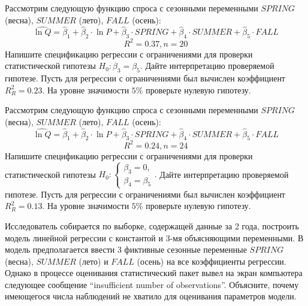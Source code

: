 \documentclass[pdftex,11pt,openany]{book}\usepackage[]{graphicx}\usepackage[]{color}
\begin{document}
\begin{problem}
 Рассмотрим следующую функцию спроса с сезонными переменными $SPRING$ (весна), $SUMMER$ (лето), $FALL$ (осень):
\[
\widehat{\ln Q}=\hat{\beta}_1+\hat{\beta}_2\cdot{\ln P}+\hat{\beta}_3\cdot{SPRING}+\hat{\beta}_4\cdot{SUMMER}+\hat{\beta}_5\cdot{FALL}
\]
\[
R^2=0.37,n=20
\]
Напишите спецификацию регрессии с ограничениями для проверки статистической гипотезы $H_0: \beta_3 = \beta_5$. Дайте интерпретацию проверяемой гипотезе. Пусть для регрессии с ограничениями был вычислен коэффициент $R_{R}^2=0.23$. На уровне значимости $5\%$ проверьте нулевую гипотезу.
\end{problem}

\begin{solution}
\end{solution}


\begin{problem}
 Рассмотрим следующую функцию спроса с сезонными переменными $SPRING$ (весна), $SUMMER$ (лето), $FALL$ (осень):
\[
\widehat{\ln Q}=\hat{\beta}_1+\hat{\beta}_2\cdot{\ln P}+\hat{\beta}_3\cdot{SPRING}+\hat{\beta}_4\cdot{SUMMER}+\hat{\beta}_5\cdot{FALL}
\]
\[
R^2=0.24,n=24
\]
Напишите спецификацию регрессии с ограничениями для проверки статистической гипотезы 
$H_0: 
  \begin{cases}
    \beta_3=0, \\
    \beta_4=\beta_5 
 \end{cases}.$
Дайте интерпретацию проверяемой гипотезе. Пусть для регрессии с ограничениями был вычислен коэффициент $R_{R}^2=0.13$. На уровне значимости $5\%$ проверьте нулевую гипотезу.
\end{problem}

\begin{solution}
\end{solution}


\begin{problem}
 Исследователь собирается по выборке, содержащей данные за 2 года,
построить модель линейной регрессии с константой и 3-мя объясняющими переменными. В модель предполагается ввести 3 фиктивные сезонные переменные $SPRING$ (весна), $SUMMER$ (лето) и $FALL$ (осень) на все коэффициенты регрессии. Однако в процессе оценивания статистический пакет вывел на экран компьютера следующее сообщение “insufficient number of observations”. Объясните, почему имеющегося числа наблюдений не хватило для оценивания параметров модели.
\end{problem}

\begin{solution}
\end{solution}
\end{document}
